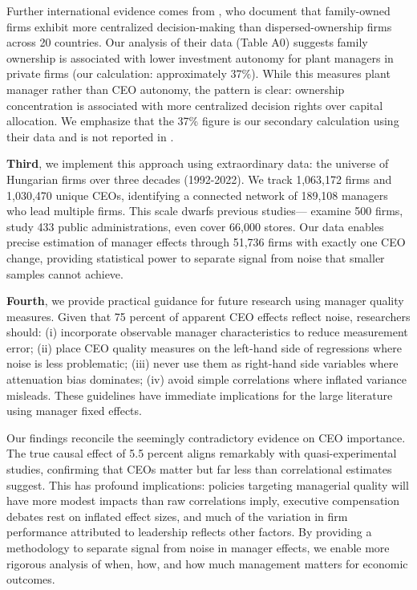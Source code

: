 \documentclass[11pt,a4paper]{article}
\begin{document}
Further international evidence comes from \citet{bloom2012organization}, who document that family-owned firms exhibit more centralized decision-making than dispersed-ownership firms across 20 countries. Our analysis of their data (Table A0) suggests family ownership is associated with lower investment autonomy for plant managers in private firms (our calculation: approximately 37\%). While this measures plant manager rather than CEO autonomy, the pattern is clear: ownership concentration is associated with more centralized decision rights over capital allocation. We emphasize that the 37\% figure is our secondary calculation using their data and is not reported in \citet{bloom2012organization}.

\textbf{Third}, we implement this approach using extraordinary data: the universe of Hungarian firms over three decades (1992-2022). We track 1,063,172 firms and 1,030,470 unique CEOs, identifying a connected network of 189,108 managers who lead multiple firms. This scale dwarfs previous studies---\citet{fee2013managers} examine 500 firms, \citet{fenizia2022managers} study 433 public administrations, even \citet{metcalfe2023managers} cover 66,000 stores. Our data enables precise estimation of manager effects through 51,736 firms with exactly one CEO change, providing statistical power to separate signal from noise that smaller samples cannot achieve.

\textbf{Fourth}, we provide practical guidance for future research using manager quality measures. Given that 75 percent of apparent CEO effects reflect noise, researchers should: (i) incorporate observable manager characteristics to reduce measurement error; (ii) place CEO quality measures on the left-hand side of regressions where noise is less problematic; (iii) never use them as right-hand side variables where attenuation bias dominates; (iv) avoid simple correlations where inflated variance misleads. These guidelines have immediate implications for the large literature using manager fixed effects.

Our findings reconcile the seemingly contradictory evidence on CEO importance. The true causal effect of 5.5 percent aligns remarkably with quasi-experimental studies, confirming that CEOs matter but far less than correlational estimates suggest. This has profound implications: policies targeting managerial quality will have more modest impacts than raw correlations imply, executive compensation debates rest on inflated effect sizes, and much of the variation in firm performance attributed to leadership reflects other factors. By providing a methodology to separate signal from noise in manager effects, we enable more rigorous analysis of when, how, and how much management matters for economic outcomes.
\end{document}
